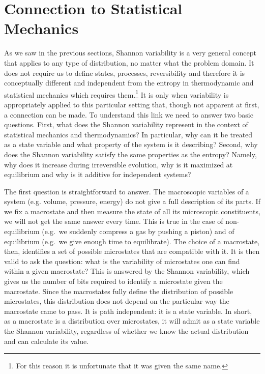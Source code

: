 \documentclass{article}
\begin{document}
\section{Connection to Statistical Mechanics\label{csm}}

As we saw in the previous sections, Shannon variability is a very general concept that applies to any type of distribution, no matter what the problem domain. It does not require us to define states, processes, reversibility and therefore it is conceptually different and independent from the entropy in thermodynamic and statistical mechanics which requires them.\footnote{For this reason it is unfortunate that it was given the same name.} It is only when variability is appropriately applied to this particular setting that, though not apparent at first, a connection can be made. To understand this link we need to answer two basic questions. First, what does the Shannon variability represent in the context of statistical mechanics and thermodynamics? In particular, why can it be treated as a state variable and what property of the system is it describing? Second, why does the Shannon variability satisfy the same properties as the entropy? Namely, why does it increase during irreversible evolution, why is it maximized at equilibrium and why is it additive for independent systems?

The first question is straightforward to answer. The macroscopic variables of a system (e.g. volume, pressure, energy) do not give a full description of its parts. If we fix a macrostate and then measure the state of all its microscopic constituents, we will not get the same answer every time. This is true in the case of non-equilibrium (e.g.~we suddenly compress a gas by pushing a piston) and of equilibrium (e.g.~we give enough time to equilibrate). The choice of a macrostate, then, identifies a set of possible microstates that are compatible with it. It is then valid to ask the question: what is the variability of microstates one can find within a given macrostate? This is answered by the Shannon variability, which gives us the number of bits required to identify a microstate given the macrostate. Since the macrostates fully define the distribution of possible microstates, this distribution does not depend on the particular way the macrostate came to pass. It is path independent: it is a state variable. In short, as a macrostate is a distribution over microstates, it will admit as a state variable the Shannon variability, regardless of whether we know the actual distribution and can calculate its value.
\end{document}
